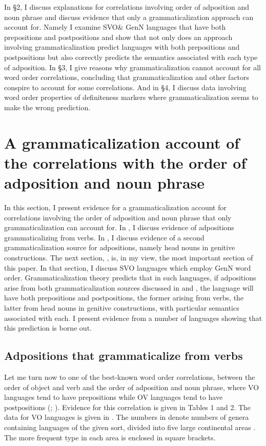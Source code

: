 \documentclass[output=paper]{langsci/langscibook}
\begin{document}
In §2, I discuss explanations for correlations involving order of adposition and noun phrase and discuss evidence that only a grammaticalization approach can account for. Namely I examine SVO\& GenN languages that have both prepositions and postpositions and show that not only does an approach involving grammaticalization predict languages with both prepositions and postpositions but also correctly predicts the semantics associated with each type of adposition. In §3, I give reasons why grammaticalization cannot account for all word order correlations, concluding that grammaticalization and other factors conspire to account for some correlations. And in §4, I discuss data involving word order properties of definiteness markers where grammaticalization seems to make the wrong prediction.

\section{A grammaticalization account of the correlations with the order of adposition and noun phrase} 

In this section, I present evidence for a grammaticalization account for correlations involving the order of adposition and noun phrase that only grammaticalization can account for. In , I discuss evidence of adpositions grammaticalizing from verbs. In , I discuss evidence of a second grammaticalization source for adpositions, namely head nouns in genitive constructions. The next section, , is, in my view, the most important section of this paper. In that section, I discuss SVO languages which employ GenN word order. Grammaticalization theory predicts that in such languages, if adpositions arise from both grammaticalization sources discussed in  and , the language will have both prepositions and postpositions, the former arising from verbs, the latter from head nouns in genitive constructions, with particular semantics associated with each. I present evidence from a number of languages showing that this prediction is borne out.

\subsection{Adpositions that grammaticalize from verbs}

Let me turn now to one of the best-known word order correlations, between the order of object and verb and the order of adposition and noun phrase, where VO languages tend to have prepositions while OV languages tend to have postpositions (\citealt{Greenberg1963}; \citealt{Dryer1992}). Evidence for this correlation is given in Tables 1 and 2. The data for VO languages is given in . The numbers in  denote numbers of genera containing languages of the given sort, divided into five large continental areas \citep{Dryer1989}. The more frequent type in each area is enclosed in square brackets.
\end{document}
